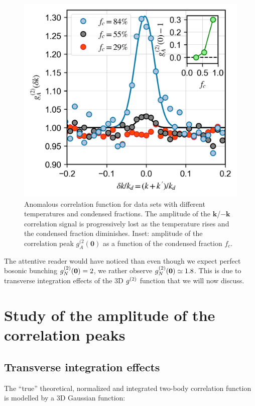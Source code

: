 \begin{figure}
    \centering
    \includegraphics{Fig/Chapter4/kmk_3_temp.png}
    \caption{Anomalous correlation function for data sets with different temperatures and condensed fractions. The amplitude of the $\bm{k}$/$-\bm{k}$ correlation signal is progressively lost as the temperature rises and the condensed fraction diminishes. Inset: amplitude of the correlation peak $g^{(2}_{A}({\bm 0})$ as a function of the condensed fraction $f_c$.}
    \label{fig:kmk_3_temp}
\end{figure}



The attentive reader would have noticed than even though we expect perfect bosonic bunching $g^{(2)}_N (\bm{0})=2$, we rather observe $g^{(2)}_N (\bm{0}) \simeq 1.8$. This is due to transverse integration effects of the 3D $g^{(2)}$ function that we will now discuss.

\section{Study of the amplitude of the correlation peaks}

\subsection{Transverse integration effects}

The ``true'' theoretical, normalized and integrated two-body correlation function is modelled by a 3D Gaussian function:

